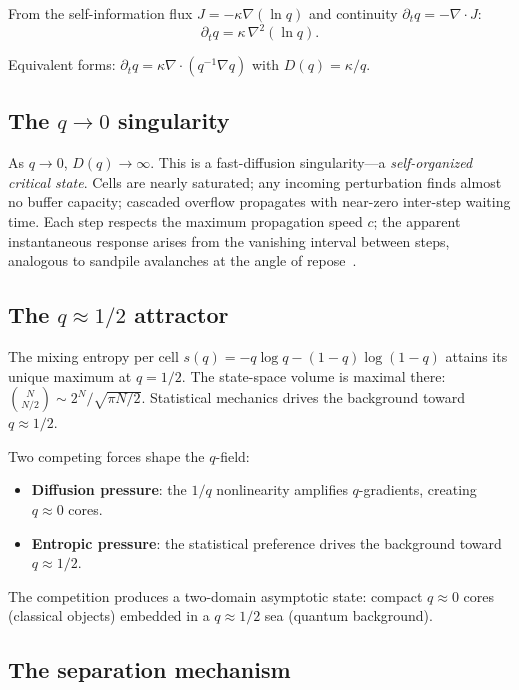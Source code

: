 \documentclass[reprint]{revtex4-2}
\begin{document}
From the self-information flux $J=-\kappa\nabla(\ln q)$ and continuity $\partial_t q = -\nabla\cdot J$:
\begin{equation}
\boxed{\partial_t q = \kappa\,\nabla^2(\ln q)}.
\label{eq:qfield}
\end{equation}

Equivalent forms: $\partial_t q = \kappa\nabla\cdot(q^{-1}\nabla q)$ with $D(q)=\kappa/q$.

\subsection{The $q\to 0$ singularity}

As $q\to 0$, $D(q)\to\infty$. This is a fast-diffusion singularity---a \emph{self-organized critical state}. Cells are nearly saturated; any incoming perturbation finds almost no buffer capacity; cascaded overflow propagates with near-zero inter-step waiting time. Each step respects the maximum propagation speed $c$; the apparent instantaneous response arises from the vanishing interval between steps, analogous to sandpile avalanches at the angle of repose~\cite{Bak1987}.

\subsection{The $q\approx 1/2$ attractor}

The mixing entropy per cell $s(q)=-q\log q-(1-q)\log(1-q)$ attains its unique maximum at $q=1/2$. The state-space volume is maximal there: $\binom{N}{N/2}\sim 2^N/\sqrt{\pi N/2}$. Statistical mechanics drives the background toward $q\approx 1/2$.

Two competing forces shape the $q$-field:
\begin{itemize}
\item \textbf{Diffusion pressure}: the $1/q$ nonlinearity amplifies $q$-gradients, creating $q\approx 0$ cores.
\item \textbf{Entropic pressure}: the statistical preference drives the background toward $q\approx 1/2$.
\end{itemize}

The competition produces a two-domain asymptotic state: compact $q\approx 0$ cores (classical objects) embedded in a $q\approx 1/2$ sea (quantum background).

\subsection{The separation mechanism}
\end{document}
